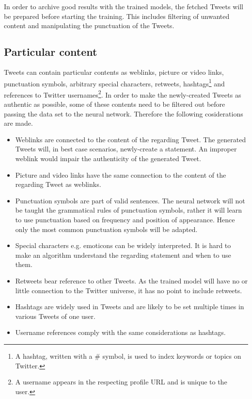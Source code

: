 \documentclass[conference]{IEEEtran}
\begin{document}
In order to archive good results with the trained models, the fetched Tweets will be prepared before starting the training. This includes filtering of unwanted content and manipulating the punctuation of the Tweets. 

\subsection{Particular content}\label{subsec_particular_content}

Tweets can contain particular contents as weblinks, picture or video links, punctuation symbols, arbitrary special characters, retweets, hashtags\footnote{A hashtag, written with a \# symbol, is used to index keywords or topics on Twitter.} and references to Twitter usernames\footnote{A username appears in the respecting profile URL and is unique to the user.}. In order to make the newly-created Tweets as authentic as possible, some of these contents need to be filtered out before passing the data set to the neural network. Therefore the following cosiderations are made.\\

\begin{itemize}
\item Weblinks are connected to the content of the regarding Tweet. The generated Tweets will, in best case scenarios, newly-create a statement. An improper weblink would impair the authenticity of the generated Tweet.
\item Picture and video links have the same connection to the content of the regarding Tweet as weblinks.
\item Punctuation symbols are part of valid sentences. The neural network will not be taught the grammatical rules of punctuation symbols, rather it will learn to use punctuation based on frequency and position of appearance. Hence only the most common punctuation symbols will be adapted.
\item Special characters e.g. emoticons can be widely interpreted. It is hard to make an algorithm understand the regarding statement and when to use them. 
\item Retweets bear reference to other Tweets. As the trained model will have no or little connection to the Twitter universe, it has no point to include retweets.
\item Hashtags are widely used in Tweets and are likely to be set multiple times in various Tweets of one user.
\item Username references comply with the same considerations as hashtags.
\end{itemize}
\end{document}

